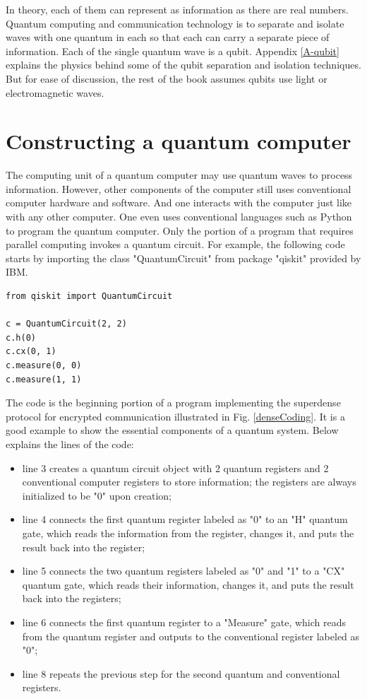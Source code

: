\documentclass[oneside, letter, 12pt]{book}
\begin{document}
In theory, each of them can represent as information as there are real numbers. Quantum computing and communication technology is to separate and isolate waves with one quantum in each so that each can carry a separate piece of information. Each of the single quantum wave is a qubit. Appendix \ref{A-qubit} explains the physics behind some of the qubit separation and isolation techniques. But for ease of discussion, the rest of the book assumes qubits use light or electromagnetic waves.

\section{Constructing a quantum computer}
The computing unit of a quantum computer may use quantum waves to process information. However, other components of the computer still uses conventional computer hardware and software. And one interacts with the computer just like with any other computer. One even uses conventional languages such as Python to program the quantum computer. Only the portion of a program that requires parallel computing invokes a quantum circuit. For example, the following code starts by importing the class "QuantumCircuit" from package "qiskit" provided by IBM.
\begin{lstlisting}
from qiskit import QuantumCircuit

c = QuantumCircuit(2, 2)
c.h(0)
c.cx(0, 1)
c.measure(0, 0)
c.measure(1, 1)    
\end{lstlisting}
The code is the beginning portion of a program implementing the superdense protocol for encrypted communication illustrated in Fig. \ref{denseCoding}. It is a good example to show the essential components of a quantum system. Below explains the lines of the code:
\begin{itemize}
\item line 3 creates a quantum circuit object with 2 quantum registers and 2 conventional computer registers to store information; the registers are always initialized to be "0" upon creation;
\item line 4 connects the first quantum register labeled as "0" to an "H" quantum gate, which reads the information from the register, changes it, and puts the result back into the register;
\item line 5 connects the two quantum registers labeled as "0" and "1" to a "CX" quantum gate, which reads their information, changes it, and puts the result back into the registers;
\item line 6 connects the first quantum register to a "Measure" gate, which reads from the quantum register and outputs to the conventional register labeled as "0";
\item line 8 repeats the previous step for the second quantum and conventional registers.
\end{itemize}
\end{document}
